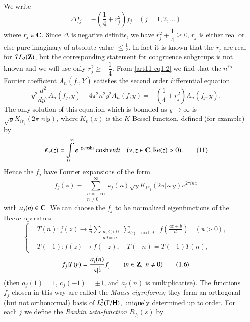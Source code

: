 We write 
\begin{equation*}
\Delta f_j = -\left(\frac{1}{4}  +r^2_j \right)f_j \quad  (j = 1, 2, \ldots ) \tag{1.2} \label{art11-eq1.2}
\end{equation*}
where $r_j \in \mathbf{C}$. Since $\Delta$ is negative definite, we have $r^2_j + \dfrac{1}{4} \geqslant 0$, \ie $r_j$ is either real or else pure imaginary of absolute value $\leqslant \frac{1}{2}$. In fact it is known that the $r_j$ are real for $SL_2 (\mathbf{Z})$, but the corresponding statement for congruence subgroups is not known and we will use only $r^2_j \geqslant - \dfrac{1}{4}$. From \eqref{art11-eq1.2} we find that the $n^{\text{th}}$ Fourier coefficient $A_n (f_j , Y)$ satisfies the second order differential equation
$$
y^2 \frac{d^2}{dy^2} A_n (f_j, y) - 4 \pi^2 n^2 y^2 A_n (f; y) =- \left(\frac{1}{4} + r^2_j \right) A_n(f_j ; y). 
$$
The only solution of this equation which is bounded as $y \to \infty$ is $\sqrt{y} K_{ir_j} (2\pi |n|y)$, where $K_v (z)$ is the $K$-Bessel function, defined (for example) by 
\begin{equation*}
K_v (z) = \int\limits^\infty_0 e^{-z \cosh t} \cosh v t d t \quad (v, z \in \mathbf{C}, \operatorname{Re} (z) > 0).\tag{11}\label{art11-eq1.3}
\end{equation*}
Hence the $f_j$ have Fourier expansions of the form 
\begin{equation*}
f_j(z) = \sum\limits^\infty_{\substack{n = - \infty \\ n \neq 0}} a_j (n) \sqrt{y} K_{ir_j} (2 \pi |n| y) e^{2 \pi in x}
\tag{1.4}\label{art11-eq1.4}
\end{equation*}
with $a_j(n) \in\mathbf{C}$. We can choose the $f_j$ to be normalized eigenfunctions of the Hecke operators
\begin{equation*}
\left\{
\begin{aligned}
&T(n) : f(z) \longrightarrow \frac{1}{n} \sum\limits_{\substack{a, d > 0\\ ad =n}} \sum\limits_{b(\mod d)} f \left(\frac{az+b}{d} \right) \quad (n >0), \\
& T (-1) : f(z) \longrightarrow f(-\bar{z}), \quad T (-n) = T (-1) T (n),
\end{aligned}
\right. \tag{1.5}\label{art11-eq1.5}
\end{equation*}
\ie\pageoriginale
\begin{equation*}
f_j |T (n) = \frac{a_j(n)}{|n|^{\frac{1}{2}}} f_j \qquad (n \in \mathbf{Z}, \; n \neq 0)  \tag{1.6}\label{art11-eq1.6}
\end{equation*}
(then $a_j (1) = 1$, $a_j (-1) = \pm 1$, and $a_j(n)$ is multiplicative). The functions $f_j$ chosen in this way are called the \textit{Maass eigenforms;} they form an orthogonal (but not orthonormal) basis of $L^2_\circ (\Gamma / \mathsf{H})$, uniquely determined up to order. For each $j$ we define the \textit{Rankin zeta-function} $R_{f_j}(s)$ by
